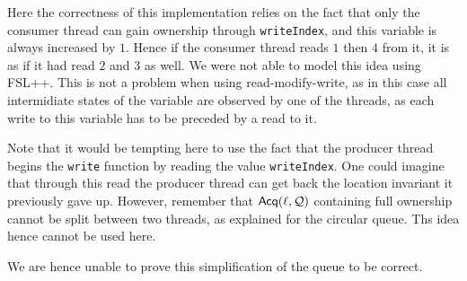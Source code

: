 Here the correctness of this implementation relies on the fact that only the consumer thread can gain ownership through \texttt{writeIndex}, and this variable is always increased by $1$. Hence if the consumer thread reads $1$ then $4$ from it, it is as if it had read $2$ and $3$ as well. We were not able to model this idea using FSL++. This is not a problem when using read-modify-write, as in this case all intermidiate states of the variable are observed by one of the threads, as each write to this variable has to be preceded by a read to it.

Note that it would be tempting here to use the fact that the producer thread begins the \texttt{write} function by reading the value \texttt{writeIndex}. One could imagine that through this read the producer thread can get back the location invariant it previously gave up. However, remember that $\operatorname{\mathsf{Acq}}(\ell, \mathcal{Q})$ containing full ownership cannot be split between two threads, as explained for the circular queue. Ths idea hence cannot be used here.

We are hence unable to prove this simplification of the queue to be correct. 
